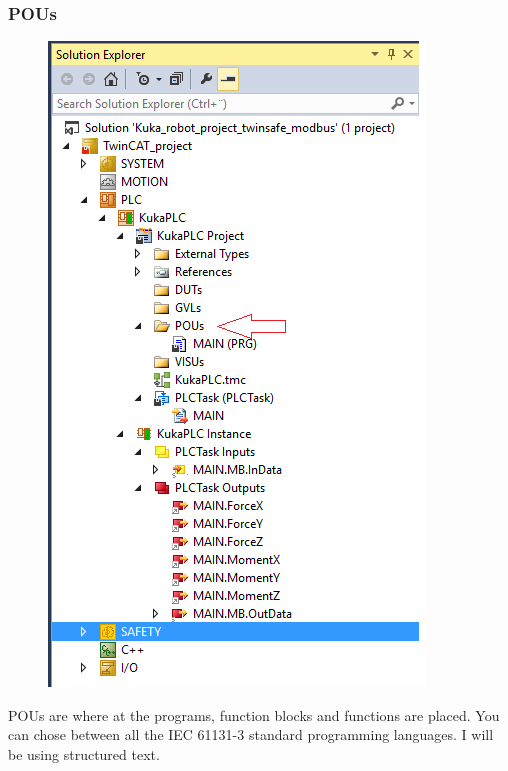 \documentclass{article}
\begin{document}
\subsubsection{POUs}
\begin{figure}[!h]
    \centering
    \includegraphics[scale=0.7]{pictures/TC3_overview/TC3_POUs.png}
    \caption{}
    \label{fig:my_label}
\end{figure}

POUs are where at the programs, function blocks and functions are placed. You can chose between all the IEC 61131-3 standard programming languages. I will be using structured text. 

\newpage
\end{document}
